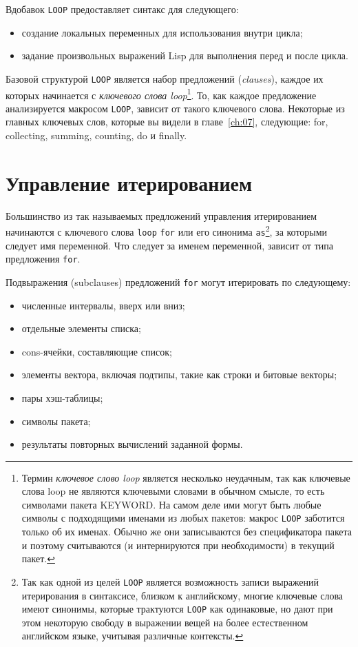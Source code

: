 Вдобавок \lstinline{LOOP} предоставляет синтакс для следующего:

\begin{itemize}
\item создание локальных переменных для использования внутри цикла;
\item задание произвольных выражений Lisp для выполнения перед и после цикла.
\end{itemize}

Базовой структурой \lstinline{LOOP} является набор предложений (\textit{clauses}), каждое их
которых начинается с \textit{ключевого слова loop}\footnote{Термин \textit{ключевое слово
    loop} является несколько неудачным, так как ключевые слова loop не являются ключевыми
  словами в обычном смысле, то есть символами пакета KEYWORD. На самом деле ими могут быть
  любые символы с подходящими именами из любых пакетов: макрос \lstinline{LOOP} заботится
  только об их именах. Обычно же они записываются без спецификатора пакета и поэтому
  считываются (и интернируются при необходимости) в текущий пакет.}. То, как каждое
предложение анализируется макросом \lstinline{LOOP}, зависит от такого ключевого
слова. Некоторые из главных ключевых слов, которые вы видели в главе~\ref{ch:07},
следующие: for, collecting, summing, counting, do и finally.

\section{Управление итерированием}

Большинство из так называемых предложений управления итерированием начинаются с ключевого
слова \lstinline{loop} \lstinline{for} или его синонима \lstinline{as}\footnote{Так как одной из целей
  \lstinline{LOOP} является возможность записи выражений итерирования в синтаксисе, близком к
  английскому, многие ключевые слова имеют синонимы, которые трактуются \lstinline{LOOP} как
  одинаковые, но дают при этом некоторую свободу в выражении вещей на более естественном
  английском языке, учитывая различные контексты.}, за которыми следует имя переменной. Что
следует за именем переменной, зависит от типа предложения \lstinline{for}.

Подвыражения (subclauses) предложений \lstinline{for} могут итерировать по следующему:
\begin{itemize}
\item численные интервалы, вверх или вниз;
\item отдельные элементы списка;
\item cons-ячейки, составляющие список;
\item элементы вектора, включая подтипы, такие как строки и битовые векторы;
\item пары хэш-таблицы;
\item символы пакета;
\item результаты повторных вычислений заданной формы.
\end{itemize}

